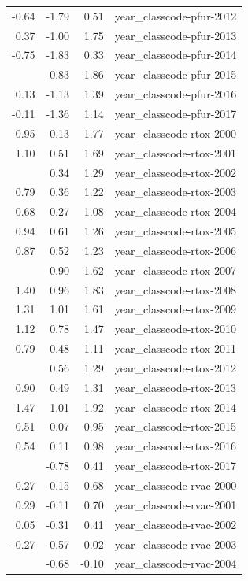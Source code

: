 \documentclass[]{article}
\begin{document}
\begin{longtable}[t]{rrrl}
-0.64 & -1.79 & 0.51 & year\_classcode-pfur-2012\\
0.37 & -1.00 & 1.75 & year\_classcode-pfur-2013\\
-0.75 & -1.83 & 0.33 & year\_classcode-pfur-2014\\
\addlinespace
0.51 & -0.83 & 1.86 & year\_classcode-pfur-2015\\
0.13 & -1.13 & 1.39 & year\_classcode-pfur-2016\\
-0.11 & -1.36 & 1.14 & year\_classcode-pfur-2017\\
0.95 & 0.13 & 1.77 & year\_classcode-rtox-2000\\
1.10 & 0.51 & 1.69 & year\_classcode-rtox-2001\\
\addlinespace
0.81 & 0.34 & 1.29 & year\_classcode-rtox-2002\\
0.79 & 0.36 & 1.22 & year\_classcode-rtox-2003\\
0.68 & 0.27 & 1.08 & year\_classcode-rtox-2004\\
0.94 & 0.61 & 1.26 & year\_classcode-rtox-2005\\
0.87 & 0.52 & 1.23 & year\_classcode-rtox-2006\\
\addlinespace
1.26 & 0.90 & 1.62 & year\_classcode-rtox-2007\\
1.40 & 0.96 & 1.83 & year\_classcode-rtox-2008\\
1.31 & 1.01 & 1.61 & year\_classcode-rtox-2009\\
1.12 & 0.78 & 1.47 & year\_classcode-rtox-2010\\
0.79 & 0.48 & 1.11 & year\_classcode-rtox-2011\\
\addlinespace
0.93 & 0.56 & 1.29 & year\_classcode-rtox-2012\\
0.90 & 0.49 & 1.31 & year\_classcode-rtox-2013\\
1.47 & 1.01 & 1.92 & year\_classcode-rtox-2014\\
0.51 & 0.07 & 0.95 & year\_classcode-rtox-2015\\
0.54 & 0.11 & 0.98 & year\_classcode-rtox-2016\\
\addlinespace
-0.18 & -0.78 & 0.41 & year\_classcode-rtox-2017\\
0.27 & -0.15 & 0.68 & year\_classcode-rvac-2000\\
0.29 & -0.11 & 0.70 & year\_classcode-rvac-2001\\
0.05 & -0.31 & 0.41 & year\_classcode-rvac-2002\\
-0.27 & -0.57 & 0.02 & year\_classcode-rvac-2003\\
\addlinespace
-0.39 & -0.68 & -0.10 & year\_classcode-rvac-2004\\

\end{longtable}
\end{document}
